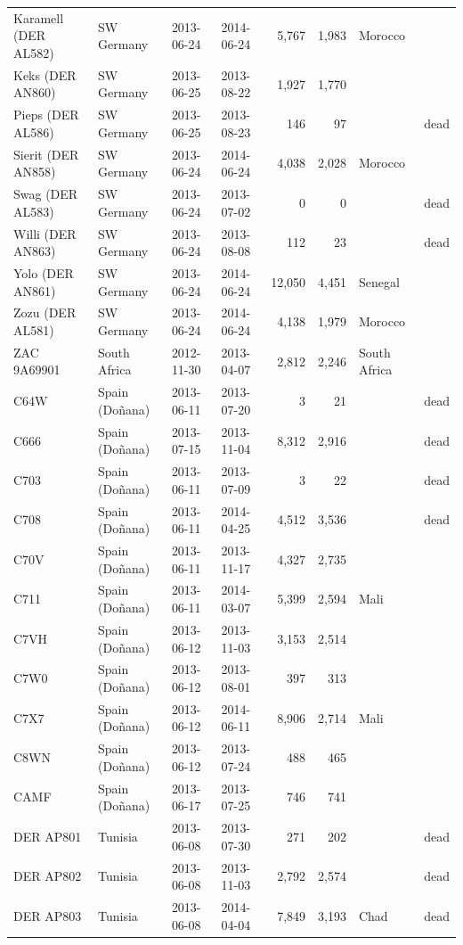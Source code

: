 \documentclass[11pt,a4paper]{article}
\begin{document}
{\begin{longtable}{llllrrll}
Karamell (DER AL582) & SW Germany & 2013-06-24 & 2014-06-24 & 5,767 & 1,983 & Morocco & \\
Keks (DER AN860) & SW Germany & 2013-06-25 & 2013-08-22 & 1,927 & 1,770 &  & \\
Pieps (DER AL586) & SW Germany & 2013-06-25 & 2013-08-23 & 146 & 97 &  & dead\\
Sierit (DER AN858) & SW Germany & 2013-06-24 & 2014-06-24 & 4,038 & 2,028 & Morocco & \\
Swag (DER AL583) & SW Germany & 2013-06-24 & 2013-07-02 & 0 & 0 &  & dead\\
Willi (DER AN863) & SW Germany & 2013-06-24 & 2013-08-08 & 112 & 23 &  & dead\\
Yolo (DER AN861) & SW Germany & 2013-06-24 & 2014-06-24 & 12,050 & 4,451 & Senegal & \\
Zozu (DER AL581) & SW Germany & 2013-06-24 & 2014-06-24 & 4,138 & 1,979 & Morocco & \\
ZAC 9A69901 & South Africa & 2012-11-30 & 2013-04-07 & 2,812 & 2,246 & South Africa & \\
C64W & Spain (Doñana) & 2013-06-11 & 2013-07-20 & 3 & 21 &  & dead\\
C666 & Spain (Doñana) & 2013-07-15 & 2013-11-04 & 8,312 & 2,916 &  & dead\\
C703 & Spain (Doñana) & 2013-06-11 & 2013-07-09 & 3 & 22 &  & dead\\
C708 & Spain (Doñana) & 2013-06-11 & 2014-04-25 & 4,512 & 3,536 &  & dead\\
C70V & Spain (Doñana) & 2013-06-11 & 2013-11-17 & 4,327 & 2,735 &  & \\
C711 & Spain (Doñana) & 2013-06-11 & 2014-03-07 & 5,399 & 2,594 & Mali & \\
C7VH & Spain (Doñana) & 2013-06-12 & 2013-11-03 & 3,153 & 2,514 &  & \\
C7W0 & Spain (Doñana) & 2013-06-12 & 2013-08-01 & 397 & 313 &  & \\
C7X7 & Spain (Doñana) & 2013-06-12 & 2014-06-11 & 8,906 & 2,714 & Mali & \\
C8WN & Spain (Doñana) & 2013-06-12 & 2013-07-24 & 488 & 465 &  & \\
CAMF & Spain (Doñana) & 2013-06-17 & 2013-07-25 & 746 & 741 &  & \\
DER AP801 & Tunisia & 2013-06-08 & 2013-07-30 & 271 & 202 &  & dead\\
DER AP802 & Tunisia & 2013-06-08 & 2013-11-03 & 2,792 & 2,574 &  & dead\\
DER AP803 & Tunisia & 2013-06-08 & 2014-04-04 & 7,849 & 3,193 & Chad & dead\\

\end{longtable}}
\end{document}
